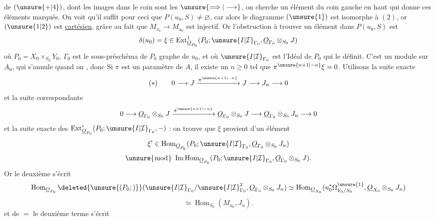  de $(\unsure{+|4})$, dont les images dans le coin
 sont les $\unsure{\Longrightarrow|\longrightarrow}$, on cherche un élément
du coin gauche en haut qui donne ces
éléments marqués. On voit qu'il suffit pour
ceci que $P(u_0,S)\ne\varnothing$, car alors le diagramme
$(\unsure{1})$ est isomorphe à $(2)$, or $(\unsure{1|2})$ est
\uline{cartésien}, grâce au fait que $M_{v_0}\longrightarrow M_{u_0}$ est
injectif. Or l'obstruction à trouver un
élément dans $P(u_0,S)$ est 
\[
\delta(u_0)=\xi\in\operatorname{Ext}^{1}_{\underline{O}_{P_0}}
(P_0;\unsure{I|\mathcal{I}}_{\Gamma_0},\underline{O}_{\Gamma_0}\otimes_{S_0}J)
\]
où $P_0=X_0\times_{S_0}Y_0$,  $\Gamma_0$ est le sous-préschéma
de $P_0$ graphe de $u_0$, et où $\unsure{I|\mathcal{I}}_{\Gamma_0}$ est l'Idéal de $P_0$
qui le définit. C'est un module sur $A_0$,
qui s'annule quand on 
, donc
Si $\pi$ est un paramètre de $A$, il existe un
$n\geq0$ tel que $\pi^{\unsure{n+1|-n}}\xi=0$. Utilisons la suite exacte
\[
(*)\qquad 0\longrightarrow J\xrightarrow{\pi^{\unsure{n+1|-n}}}J\longrightarrow J_n\longrightarrow0
\]
et la suite correspondante
\[
0\longrightarrow\underline{O}_{\Gamma_0}\otimes_{S_0}J
\xrightarrow{\pi^{\unsure{n+1|-n}}}\underline{O}_{\Gamma_0}\otimes_{S_0}J
\longrightarrow\underline{O}_{\Gamma_0}\otimes_{S_0}J_n\longrightarrow0
\]
et la suite exacte des $\operatorname{Ext}^{i}_{\underline{O}_{P_0}}(P_0;\unsure{I|\mathcal{I}}_{\Gamma_0},-)$ : on
trouve que $\xi$ provient d'un élément
\[
\xi'\in\operatorname{Hom}_{\underline{O}_{P_0}}(P_0;\unsure{I|\mathcal{I}}_{\Gamma_0},\underline{O}_{\Gamma_0}\otimes_{S_0}J_n)
\]
\[
\unsure{\bmod}\ \operatorname{Im}\operatorname{Hom}_{\underline{O}_{P_0}}
(P_0;\unsure{I|\mathcal{I}}_{\Gamma_0},\underline{O}_{\Gamma_0}\otimes_{S_0}J).
\]
Or le  deuxième  s'écrit
\[
\operatorname{Hom}_{\underline{O}_{P_0}}\deleted{\unsure{(P_0;)}}
(\unsure{I|\mathcal{I}}_{\Gamma_0}/\unsure{I|\mathcal{I}}_{\Gamma_0}^{2},\underline{O}_{\Gamma_0}\otimes_{S_0}J_n)
\simeq\operatorname{Hom}_{\underline{O}_{X_0}}(u_0^*\Omega^{\unsure{1}}_{Y_0/S_0},\underline{O}_{X_0}\otimes_{S_0}J_n)
\]
\[
\simeq\operatorname{Hom}_{S_0}(M_{u_0},J_n).
\]
et de $=$ le deuxième terme s'écrit
